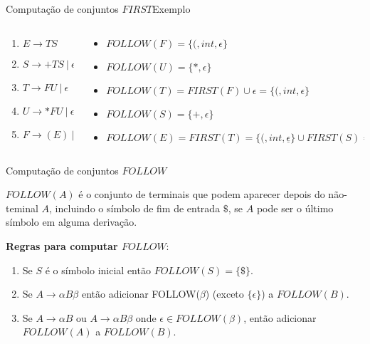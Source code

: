 \begin{frame}{Computação de conjuntos $FIRST$}{Exemplo}
    \begin{columns}
        \begin{column}{0.3\textwidth}
            \begin{enumerate}
              \item $E \rightarrow T S$

              \item $S \rightarrow + T S\ |\ \epsilon$

              \item $T \rightarrow F U\ |\ \epsilon$

              \item $U \rightarrow * F U\ |\ \epsilon$

              \item $F \rightarrow ( E )\ |\ int$
            \end{enumerate}
        \end{column}    
        \pause
        \begin{column}{0.7\textwidth}
            \begin{itemize}
                \item $FOLLOW(F) = \{(, int, \epsilon\}$
                \item $FOLLOW(U) = \{*, \epsilon\}$
                \item $FOLLOW(T) = FIRST(F) \cup {\epsilon} = \{(, int, \epsilon\}$ 
                \item $FOLLOW(S) = \{+, \epsilon\}$
                \item $FOLLOW(E) =  FIRST(T) = \{(, int, \underline{\epsilon}\} \cup FIRST(S) = \{(, int, +, \epsilon\}$
            \end{itemize}
        \end{column}    
    \end{columns}
\end{frame}

\begin{frame}{Computação de conjuntos $FOLLOW$}

    $FOLLOW(A)$ é o conjunto de terminais que podem aparecer 
depois do não-teminal $A$, incluindo o símbolo de fim de entrada
$\$$, se $A$ pode ser o último símbolo em alguma derivação.\bigskip

{\bf Regras para computar $FOLLOW$}:\medskip

 \begin{enumerate}
    \item Se $S$ é o símbolo inicial então $FOLLOW(S)=\{\$\}$.
    \item Se $A \rightarrow \alpha B\beta$ então adicionar FOLLOW($\beta$) (exceto $\{\epsilon\}$) a $FOLLOW(B)$.
    \item Se $A \rightarrow \alpha B$ ou $A \rightarrow \alpha B\beta$ onde $\epsilon \in FOLLOW(\beta)$, 
            então adicionar $FOLLOW(A)$ a $FOLLOW(B)$.
 \end{enumerate}

\end{frame}

